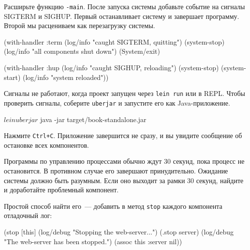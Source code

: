 \fi

Расширьте функцию \verb|-main|. После запуска системы добавьте событие на
сигналы SIGTERM и SIGHUP. Первый останавливает систему и завершает
программу. Второй мы расцениваем как перезагрузку системы.



\begin{english}
  \begin{clojure}
(with-handler :term
  (log/info "caught SIGTERM, quitting")
  (system-stop)
  (log/info "all components shut down")
  (System/exit)
  \end{clojure}
\end{english}

\pagebreaklarge

\begin{english}
  \begin{clojure}
(with-handler :hup
  (log/info "caught SIGHUP, reloading")
  (system-stop)
  (system-start)
  (log/info "system reloaded"))
  \end{clojure}
\end{english}

Сигналы не работают, когда проект запущен через \verb|lein run| или в
REPL. Чтобы проверить сигналы, соберите \verb|uberjar| и запустите его как
Java-приложение.

\begin{english}
  \begin{bash}
$ lein uberjar
$ java -jar target/book-standalone.jar
  \end{bash}
\end{english}

Нажмите \verb|Ctrl+C|. Приложение завершится не сразу, и вы увидите сообщение
об остановке всех компонентов.

Программы по управлению процессами обычно ждут 30 секунд, пока процесс не
остановится. В противном случае его завершают принудительно. Ожидание системы
должно быть разумным. Если оно выходит за рамки 30 секунд, найдите и доработайте
проблемный компонент.

Простой способ найти его~--- добавить в метод \verb|stop| каждого компонента
отладочный лог:

\begin{english}
  \begin{clojure}
(stop [this]
  (log/debug "Stopping the web-server...")
  (.stop server)
  (log/debug "The web-server has been stopped.")
  (assoc this :server nil))
  \end{clojure}
\end{english}

